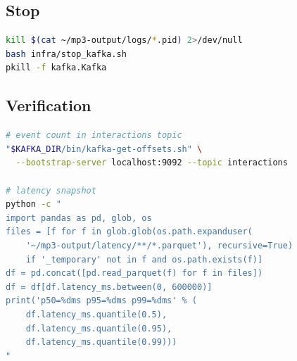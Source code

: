 \documentclass[11pt,a4paper]{article}
\begin{document}
\subsection{Stop}
\begin{lstlisting}[language=bash]
kill $(cat ~/mp3-output/logs/*.pid) 2>/dev/null
bash infra/stop_kafka.sh
pkill -f kafka.Kafka
\end{lstlisting}

\subsection{Verification}
\begin{lstlisting}[language=bash]
# event count in interactions topic
"$KAFKA_DIR/bin/kafka-get-offsets.sh" \
  --bootstrap-server localhost:9092 --topic interactions

# latency snapshot
python -c "
import pandas as pd, glob, os
files = [f for f in glob.glob(os.path.expanduser(
    '~/mp3-output/latency/**/*.parquet'), recursive=True)
    if '_temporary' not in f and os.path.exists(f)]
df = pd.concat([pd.read_parquet(f) for f in files])
df = df[df.latency_ms.between(0, 600000)]
print('p50=%dms p95=%dms p99=%dms' % (
    df.latency_ms.quantile(0.5),
    df.latency_ms.quantile(0.95),
    df.latency_ms.quantile(0.99)))
"
\end{lstlisting}
\end{document}
